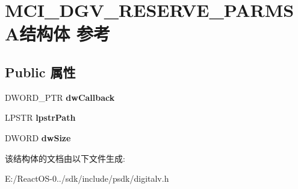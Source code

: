 \hypertarget{struct_m_c_i___d_g_v___r_e_s_e_r_v_e___p_a_r_m_s_a}{}\section{M\+C\+I\+\_\+\+D\+G\+V\+\_\+\+R\+E\+S\+E\+R\+V\+E\+\_\+\+P\+A\+R\+M\+S\+A结构体 参考}
\label{struct_m_c_i___d_g_v___r_e_s_e_r_v_e___p_a_r_m_s_a}
\subsection*{Public 属性}
\begin{DoxyCompactItemize}
\item 
\mbox{\label{struct_m_c_i___d_g_v___r_e_s_e_r_v_e___p_a_r_m_s_a_a3d3eb0840458ebf27d0eaec95f06731c}} 
D\+W\+O\+R\+D\+\_\+\+P\+TR {\bfseries dw\+Callback}
\item 
\mbox{\label{struct_m_c_i___d_g_v___r_e_s_e_r_v_e___p_a_r_m_s_a_ab336fd29dd30e56df83cdb0086bea652}} 
L\+P\+S\+TR {\bfseries lpstr\+Path}
\item 
\mbox{\label{struct_m_c_i___d_g_v___r_e_s_e_r_v_e___p_a_r_m_s_a_a3d3b5e726b3ebee1835c284acaf611e2}} 
D\+W\+O\+RD {\bfseries dw\+Size}
\end{DoxyCompactItemize}


该结构体的文档由以下文件生成\+:\begin{DoxyCompactItemize}
\item 
E\+:/\+React\+O\+S-\/0../sdk/include/psdk/digitalv.\+h\end{DoxyCompactItemize}

